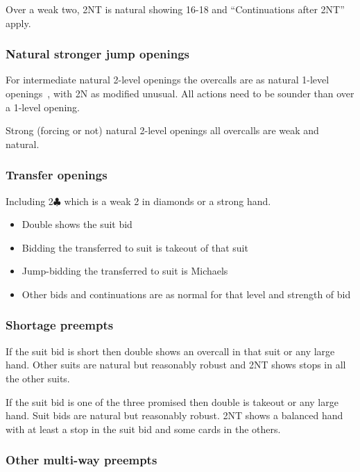 \documentclass[a4paper,14pt]{extarticle}
\begin{document}
Over a weak two,  2NT is natural showing 16-18 and ``Continuations after 2NT'' 
apply.

\subsubsection{Natural stronger jump openings}
\label{sec:def:inter-strong}

For intermediate natural 2-level openings the overcalls are as natural 1-level
openings~, with 2N as modified unusual. All actions need to be
sounder than over a 1-level opening.

Strong (forcing or not) natural 2-level openings all overcalls are weak and natural.

\subsubsection{Transfer openings}
\label{sec:def:transfer}

Including 2$\clubsuit$ which is a weak 2 in diamonds or a strong hand.

\begin{itemize}
\item Double shows the suit bid
\item Bidding the transferred to suit is takeout of that suit
\item Jump-bidding the transferred to suit is Michaels
\item Other bids and continuations are as normal for that level and strength of bid
\end{itemize}

\subsubsection{Shortage preempts}

If the suit bid is short then double shows an overcall in that suit or any
large hand.  Other suits are natural but reasonably robust and 2NT shows stops
in all the other suits.

If the suit bid is one of the three promised then double is takeout or any large hand.
Suit bids are natural but reasonably robust. 2NT shows a balanced hand with at 
least a stop in the suit bid and some cards in the others.

\subsubsection{Other multi-way preempts}
\end{document}
